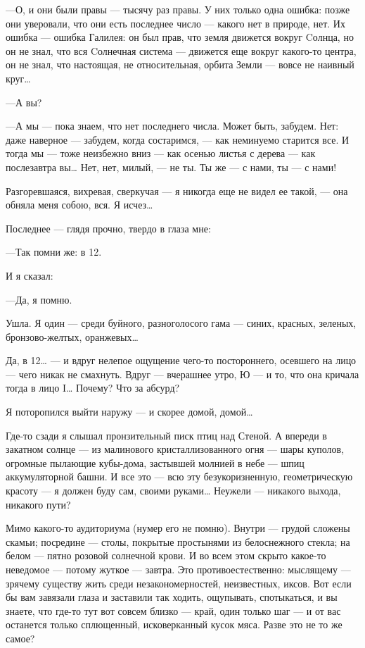 \documentclass[11pt,openany]{book}
\begin{document}
---О, и они были правы --- тысячу раз правы. У них только одна ошибка: позже они уверовали, что они есть последнее число --- какого нет в природе, нет. Их ошибка --- ошибка Галилея: он был прав, что земля движется вокруг Cолнца, но он не знал, что вся Cолнечная система --- движется еще вокруг какого-то центра, он не знал, что настоящая, не относительная, орбита Земли --- вовсе не наивный круг\ldots{}

---А вы?

---А мы --- пока знаем, что нет последнего числа. Может быть, забудем. Нет: даже наверное --- забудем, когда состаримся, --- как неминуемо старится все. И тогда мы --- тоже неизбежно вниз --- как осенью листья с дерева --- как послезавтра вы\ldots{} Нет, нет, милый, --- не ты. Ты же --- с нами, ты --- с нами!

Разгоревшаяся, вихревая, сверкучая --- я никогда еще не видел ее такой, --- она обняла меня собою, вся. Я исчез\ldots{}

Последнее --- глядя прочно, твердо в глаза мне:

---Так помни же: в 12.

И я сказал:

---Да, я помню.

Ушла. Я один --- среди буйного, разноголосого гама --- синих, красных, зеленых, бронзово-желтых, оранжевых\ldots{}

Да, в 12\ldots{} --- и вдруг нелепое ощущение чего-то постороннего, осевшего на лицо --- чего никак не смахнуть. Вдруг --- вчерашнее утро, Ю --- и то, что она кричала тогда в лицо I\ldots{} Почему? Что за абсурд?

Я поторопился выйти наружу --- и скорее домой, домой\ldots{}

Где-то сзади я слышал пронзительный писк птиц над Стеной. А впереди в закатном солнце --- из малинового кристаллизованного огня --- шары куполов, огромные пылающие кубы-дома, застывшей молнией в небе --- шпиц аккумуляторной башни. И все это --- всю эту безукоризненную, геометрическую красоту --- я должен буду сам, своими руками\ldots{} Неужели --- никакого выхода, никакого пути?

Мимо какого-то аудиториума (нумер его не помню). Внутри --- грудой сложены скамьи; посредине --- столы, покрытые простынями из белоснежного стекла; на белом --- пятно розовой солнечной крови. И во всем этом скрыто какое-то неведомое --- потому жуткое --- завтра. Это противоестественно: мыслящему --- зрячему существу жить среди незакономерностей, неизвестных, иксов. Вот если бы вам завязали глаза и заставили так ходить, ощупывать, спотыкаться, и вы знаете, что где-то тут вот совсем близко --- край, один только шаг --- и от вас останется только сплющенный, исковерканный кусок мяса. Разве это не то же самое?
\end{document}

